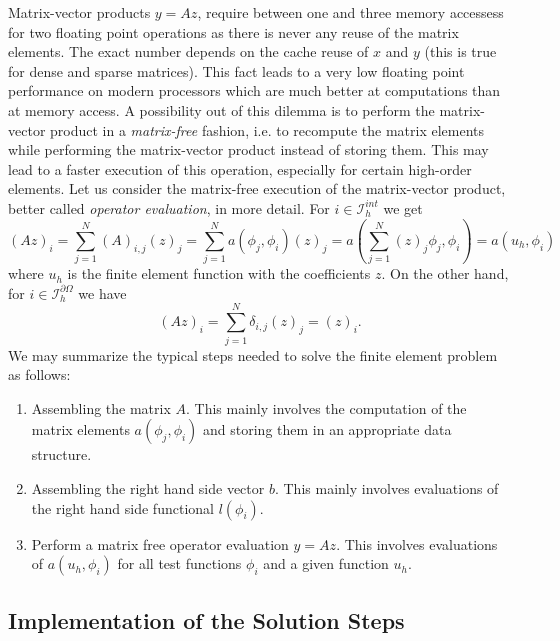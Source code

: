 \documentclass[a4paper,
		     11pt,
		     DIV12,
		     DIVcalc,
		     headings=normal,
		     oneside,
		     bibliography=totoc,
		     headsepline=false,
		     headinclude]{scrartcl}
\begin{document}
Matrix-vector products $y=Az$, require between one and three memory accessess for two
floating point operations as there is never any reuse of the matrix elements.
The exact number depends on the cache reuse of $x$ and $y$ (this is true for
dense and sparse matrices). This fact leads to a very low floating point performance
on modern processors which are much better at computations than at memory access.
A possibility out of this dilemma is to perform the matrix-vector  product in a
{\em matrix-free} fashion, i.e. to recompute the matrix elements while performing
the matrix-vector product instead of storing them. This may lead to a faster 
execution of this operation, especially for certain high-order elements.
Let us consider the matrix-free execution of the matrix-vector product, 
better called {\em operator evaluation}, in more detail.
For $i\in\mathcal{I}_h^{int}$ we get
\begin{equation}
(Az)_i = \sum_{j=1}^N (A)_{i,j} (z)_j = \sum_{j=1}^N a(\phi_j,\phi_i) (z)_j = 
 a\left(\sum_{j=1}^N (z)_j\phi_j,\phi_i\right) = a(u_h,\phi_i) 
\label{eq:opeval}
\end{equation}
where $u_h$ is the finite element function with the coefficients $z$. On the other
hand, for $i\in\mathcal{I}_h^{\partial\Omega}$ we have
\begin{equation*}
(Az)_i = \sum_{j=1}^N \delta_{i,j} (z)_j = (z)_i .
\end{equation*}
We may summarize the typical steps needed to solve the 
finite element problem as follows:
\begin{enumerate}[1)]
\item Assembling the matrix $A$. This mainly involves the computation of the matrix
elements $a(\phi_j,\phi_i)$ and storing them in an appropriate data structure.
\item Assembling the right hand side vector $b$. This mainly involves evaluations of
the right hand side functional $l(\phi_i)$.
\item Perform a matrix free operator evaluation $y=Az$. This involves evaluations
of $a(u_h,\phi_i)$ for all test functions $\phi_i$ and a given function $u_h$.
\end{enumerate}

\subsection{Implementation of the Solution Steps}
\end{document}
